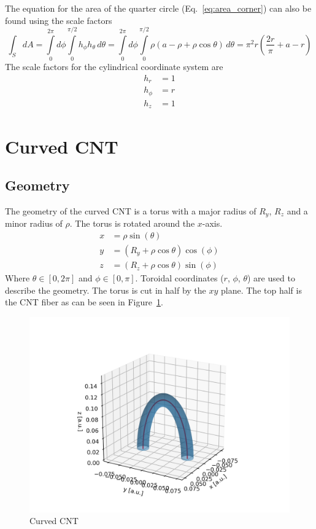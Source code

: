 \documentclass[a4paper,10pt]{article}
\numberwithin{equation}{section}
\begin{document}
%
The equation for the area of the quarter circle (Eq.~\ref{eq:area_corner}) can also be found using the scale factors
\begin{equation}
  \int_S dA = \int\limits_0^{2\pi} d\phi \int\limits_0^{\pi/2} h_\phi h_\theta\, d\theta = \int\limits_0^{2\pi} d\phi \int\limits_0^{\pi/2} \rho(a - \rho + \rho\cos\theta)\, d\theta = \pi^2 r \left( \frac{2r}{\pi} + a - r \right)
\end{equation}
%
The scale factors for the cylindrical coordinate system are
\begin{align}
  h_r    & = 1\\
  h_\phi & = r\\
  h_z    & = 1
\end{align}
%
%
\section{Curved CNT}
\subsection{Geometry}
The geometry of the curved CNT is a torus with a major radius of \(R_y\), \(R_z\) and a minor radius of \(\rho\). The torus is rotated around the \(x\)-axis.
\begin{align}
x &= \rho\sin(\theta)\\
y &= \left(R_y + \rho\cos\theta\right)\cos(\phi)\\
z &= \left(R_z + \rho\cos\theta\right)\sin(\phi)
\end{align}
Where \(\theta \in [0, 2\pi]\) and \(\phi \in [0, \pi]\). Toroidal coordinates (\(r\), \(\phi\), \(\theta\)) are used to describe the geometry.
The torus is cut in half by the \(xy\) plane.
The top half is the CNT fiber as can be seen in Figure~\ref{fig:curved_cnt}.
\begin{figure}
  \centering
  \includegraphics[scale=0.4]{figures/curved_cnt.png}
  \caption{Curved CNT\label{fig:curved_cnt}}
\end{figure}
\end{document}
